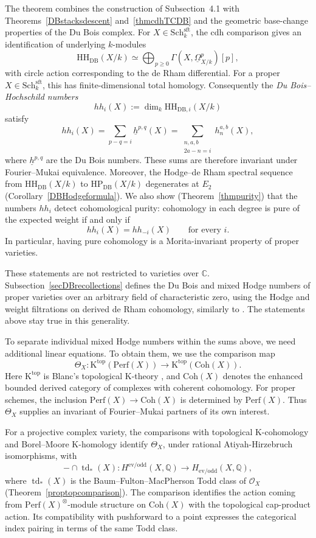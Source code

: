 \documentclass{amsart}
\theoremstyle{plain}
\theoremstyle{definition}
\newcommand{\bbC}{\mathbb{C}}
\newcommand{\bbQ}{\mathbb{Q}}
\newcommand{\Perf}{\mathrm{Perf}}
\newcommand{\HH}{\mathrm{HH}}
\newcommand{\HP}{\mathrm{HP}}
\newcommand{\K}{\mathrm{K}}
\newcommand{\Coh}{\mathrm{Coh}}
\newcommand{\Sch}{\mathrm{Sch}}
\DeclareMathOperator{\td}{td}
\newcommand{\DB}{\mathrm{DB}}
\newcommand{\sft}{\mathrm{sft}}
\begin{document}
The theorem combines the construction of Subsection~4.1
with Theorems~\ref{DBstacksdescent} and~\ref{thmcdhTCDB} and the geometric base-change properties of the Du Bois complex. For $X\in\Sch^\sft_k$, the cdh comparison gives an identification of underlying $k$-modules
\[
\HH_{\DB}(X/k)\simeq
\bigoplus_{p\geq0}
\Gamma(X,\underline\Omega^p_{X/k})[p],
\]
with circle action corresponding to the de Rham differential.
For a proper $X\in\Sch^\sft_k$, this has finite-dimensional total homology.
Consequently the \emph{Du Bois--Hochschild numbers}
\[
hh_i(X):=\dim_k\HH_{\DB,i}(X/k)
\]
satisfy
\[
hh_i(X)
=
\sum_{p-q=i}\underline h^{p,q}(X)
=
\sum_{\substack{n,a,b\\2a-n=i}}h_n^{a,b}(X),
\]
where $\underline h^{p,q}$ are the Du Bois numbers.
These sums are therefore invariant under Fourier--Mukai equivalence. Moreover, the Hodge--de Rham spectral sequence from $\HH_{\DB}(X/k)$ to $\HP_{\DB}(X/k)$ degenerates at
$E_2$ (Corollary~\ref{DBHodgeformula}). We also show (Theorem~\ref{thmpurity}) that the numbers $hh_i$ detect cohomological purity: cohomology in each degree is pure of the expected weight if and only if
\[
hh_i(X)=hh_{-i}(X)
\qquad\text{for every }i.
\]
In particular, having pure cohomology is a Morita-invariant property of proper varieties.

These statements are not restricted to varieties over $\bbC$.
Subsection~\ref{secDBrecollections} defines the Du Bois and mixed Hodge numbers of proper varieties over an arbitrary field of characteristic zero, using the Hodge and weight filtrations on derived de Rham cohomology, similarly to \cite{Bha12}. The statements above stay true in this generality.

\medskip

To separate individual mixed Hodge numbers within the sums above, we need additional linear equations. To obtain them, we use the comparison map
\[
\Theta_X:
\K^{\mathrm{top}}(\Perf(X))
\longrightarrow
\K^{\mathrm{top}}(\Coh(X)).
\]
Here $\K^{\mathrm{top}}$ is Blanc's topological $\K$-theory
\cite{Bla16}, and $\Coh(X)$ denotes the enhanced bounded derived category of complexes with coherent cohomology. For proper schemes, the inclusion
$\Perf(X)\to\Coh(X)$ is determined by $\Perf(X)$.
Thus $\Theta_X$ supplies an invariant of Fourier--Mukai partners of its own interest.

For a projective complex variety, the comparisons with topological $\K$-cohomology and Borel--Moore
$\K$-homology identify $\Theta_X$, under rational Atiyah-Hirzebruch isomorphisms, with
\[
-\cap\td_*(X):
H^{\mathrm{ev/odd}}(X,\bbQ)
\longrightarrow
H_{\mathrm{ev/odd}}(X,\bbQ),
\]
where $\td_*(X)$ is the Baum--Fulton--MacPherson Todd class of $\mathcal O_X$
(Theorem~\ref{proptopcomparison}).
The comparison identifies the action coming from $\Perf(X)^\otimes$-module structure on $\Coh(X)$ with the topological cap-product action. Its compatibility with pushforward to a point expresses the categorical index pairing in terms of the same Todd class.
\end{document}
